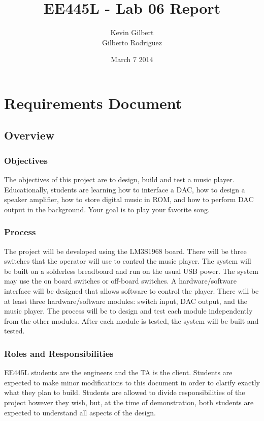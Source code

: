 \documentclass[twoside]{article}
\title{EE445L - Lab 06 Report}
\author{Kevin Gilbert\\ Gilberto Rodriguez}
\date{March 7 2014}
\begin{document}
\raggedbottom
\maketitle{}

\section*{Requirements Document}
\subsection*{Overview} 
\subsubsection*{Objectives} 
The objectives of this project are to design, build and test a music player. Educationally, students are learning how to interface a DAC, how to design a speaker amplifier, how to store digital music in ROM, and how to perform DAC output in the background. Your goal is to play your favorite song. 
 
\subsubsection*{Process}
The project will be developed using the LM3S1968 board. There will be three switches that the operator will use to control the music player. The system will be built on a solderless breadboard and run on the usual USB power. The system may use the on board switches or off-board switches. A hardware/software interface will be designed that allows software to control the player. There will be at least three hardware/software modules: switch input, DAC output, and the music player. The process will be to design and test each module independently from the other modules. After each module is tested, the system will be built and tested. 
 
\subsubsection*{Roles and Responsibilities}
EE445L students are the engineers and the TA is the client. Students are expected to make minor modifications to this document in order to clarify exactly what they plan to build. Students are allowed to divide responsibilities of the project however they wish, but, at the time of demonstration, both students are expected to understand all aspects of the design. 
 
\end{document}
